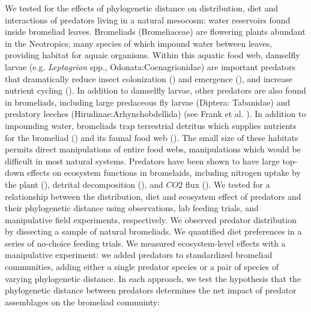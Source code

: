 \documentclass[11pt]{article}
\begin{document}
We tested for the effects of phylogenetic distance on distribution, diet
and interactions of predators living in a natural mesocosm: water
reservoirs found inside bromeliad leaves. Bromeliads (Bromeliaceae) are 
flowering plants abundant in the Neotropics; many species of which impound water between leaves, providing habitat for aquaic organisms. Within this aquatic food
web, damselfly larvae (e.g. \emph{Leptagrion} spp.,
Odonata:Coenagrionidae) are important predators that dramatically reduce
insect colonization (\citealt{Hammill2015}) and emergence
(\citealt{Starzomski2010}), and increase nutrient cycling (\citealt{Ngai2006}).
In addition to damselfly larvae, other predators are also found in
bromeliads, including large predaceous fly larvae (Diptera: Tabanidae)
and predatory leeches (Hirudinae:Arhynchobdellida) (see Frank et al.
\citeyearpar{Frank2009}).  In addition to impounding water,  bromeliads trap terrestrial detritus which supplies nutrients for the bromeliad (\citealt{Reich2003a}) and its faunal food web (\citealt{Farjalla2016}). The small size of these habitats permits direct
manipulations of entire food webs, manipulations which would be
difficult in most natural systems. Predators have been shown to have
large top-down effects on ecosystem functions in bromelaids, including
nitrogen uptake by the plant (\citealt{Ngai2006}), detrital decomposition (\citealt{Srivastava2006a}),
and $CO2$ flux (\citealt{Atwood2014, Atwood2013}).
We tested for a relationship between the distribution, diet and
ecosystem effect of predators and their phylogenetic distance using
observations, lab feeding trials, and manipulative field experiments,
respectively. We observed predator distribution by dissecting a sample
of natural bromeliads. We quantified diet preferences in a series of
no-choice feeding trials. We measured ecosystem-level effects with a
manipulative experiment: we added predators to standardized bromeliad communities, adding either a single predator species or a pair of species of varying phylogenetic distance. In each approach, we test the hypothesis that the phylogenetic distance between predators determines the net impact of predator assemblages on the bromeliad commuinty:
\end{document}
